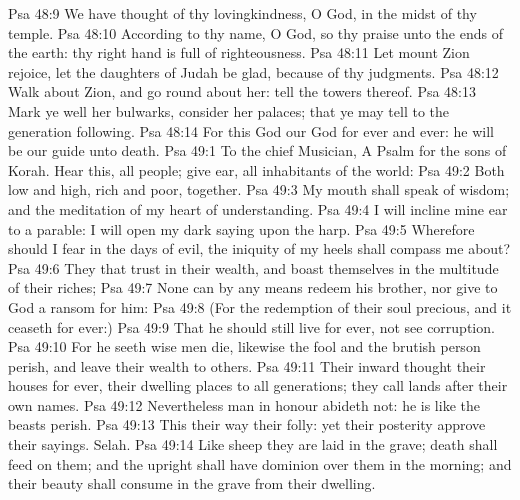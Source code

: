 \vs Psa 48:9 We have thought of thy lovingkindness, O God, in the midst of thy temple.
\vs Psa 48:10 According to thy name, O God, so  thy praise unto the ends of the earth: thy right hand is full of righteousness.
\vs Psa 48:11 Let mount Zion rejoice, let the daughters of Judah be glad, because of thy judgments.
\vs Psa 48:12 Walk about Zion, and go round about her: tell the towers thereof.
\vs Psa 48:13 Mark ye well her bulwarks, consider her palaces; that ye may tell  to the generation following.
\vs Psa 48:14 For this God  our God for ever and ever: he will be our guide  unto death.
\vs Psa 49:1 To the chief Musician, A Psalm for the sons of Korah. Hear this, all  people; give ear, all  inhabitants of the world:
\vs Psa 49:2 Both low and high, rich and poor, together.
\vs Psa 49:3 My mouth shall speak of wisdom; and the meditation of my heart  of understanding.
\vs Psa 49:4 I will incline mine ear to a parable: I will open my dark saying upon the harp.
\vs Psa 49:5 Wherefore should I fear in the days of evil,  the iniquity of my heels shall compass me about?
\vs Psa 49:6 They that trust in their wealth, and boast themselves in the multitude of their riches;
\vs Psa 49:7 None  can by any means redeem his brother, nor give to God a ransom for him:
\vs Psa 49:8 (For the redemption of their soul  precious, and it ceaseth for ever:)
\vs Psa 49:9 That he should still live for ever,  not see corruption.
\vs Psa 49:10 For he seeth  wise men die, likewise the fool and the brutish person perish, and leave their wealth to others.
\vs Psa 49:11 Their inward thought  their houses  for ever,  their dwelling places to all generations; they call  lands after their own names.
\vs Psa 49:12 Nevertheless man  in honour abideth not: he is like the beasts  perish.
\vs Psa 49:13 This their way  their folly: yet their posterity approve their sayings. Selah.
\vs Psa 49:14 Like sheep they are laid in the grave; death shall feed on them; and the upright shall have dominion over them in the morning; and their beauty shall consume in the grave from their dwelling.

